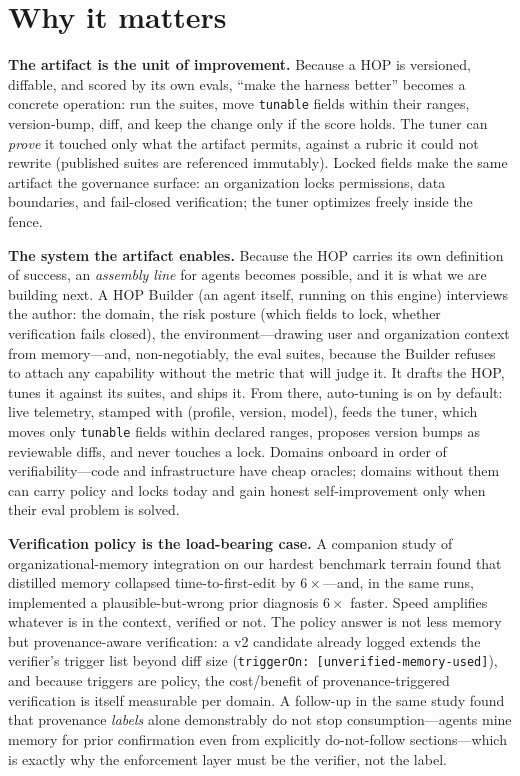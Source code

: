 \documentclass[10pt]{article}
\begin{document}
\section{Why it matters}

\textbf{The artifact is the unit of improvement.} Because a HOP is versioned, diffable, and scored by
its own evals, ``make the harness better'' becomes a concrete operation: run the suites, move
\texttt{tunable} fields within their ranges, version-bump, diff, and keep the change only if the score
holds. The tuner can \emph{prove} it touched only what the artifact permits, against a rubric it could
not rewrite (published suites are referenced immutably). Locked fields make the same artifact the
governance surface: an organization locks permissions, data boundaries, and fail-closed verification;
the tuner optimizes freely inside the fence.

\textbf{The system the artifact enables.} Because the HOP carries its own definition of success, an
\emph{assembly line} for agents becomes possible, and it is what we are building next. A HOP Builder
(an agent itself, running on this engine) interviews the author: the domain, the risk posture (which
fields to lock, whether verification fails closed), the environment---drawing user and organization
context from memory---and, non-negotiably, the eval suites, because the Builder refuses to attach any
capability without the metric that will judge it. It drafts the HOP, tunes it against its suites, and
ships it. From there, auto-tuning is on by default: live telemetry, stamped with (profile, version,
model), feeds the tuner, which moves only \texttt{tunable} fields within declared ranges, proposes
version bumps as reviewable diffs, and never touches a lock. Domains onboard in order of
verifiability---code and infrastructure have cheap oracles; domains without them can carry policy and
locks today and gain honest self-improvement only when their eval problem is solved.

\textbf{Verification policy is the load-bearing case.} A companion study of organizational-memory
integration on our hardest benchmark terrain found that distilled memory collapsed time-to-first-edit
by $6\times$---and, in the same runs, implemented a plausible-but-wrong prior diagnosis $6\times$
faster. Speed amplifies whatever is in the context, verified or not. The policy answer is not less
memory but provenance-aware verification: a v2 candidate already logged extends the verifier's trigger
list beyond diff size (\texttt{triggerOn: [unverified-memory-used]}), and because triggers are policy,
the cost/benefit of provenance-triggered verification is itself measurable per domain. A follow-up in
the same study found that provenance \emph{labels} alone demonstrably do not stop consumption---agents
mine memory for prior confirmation even from explicitly do-not-follow sections---which is exactly why
the enforcement layer must be the verifier, not the label.
\end{document}
